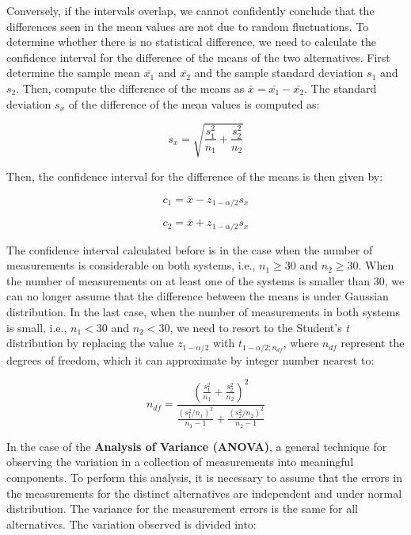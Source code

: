 Conversely, if the intervals overlap, we cannot confidently conclude that the differences seen in the mean values are not due to random fluctuations. To determine whether there is no statistical difference, we need to calculate the confidence interval for the difference of the means of the two alternatives. First determine the sample mean \(\bar{x_1}\) and \(\bar{x_2}\) and the sample standard deviation \(s_1\) and \(s_2\). Then, compute the difference of the means as \(\bar{x} = \bar{x_1} - \bar{x_2}\). The standard deviation \(s_x\) of the difference of the mean values is computed as:

\begin{equation}
  s_x = \sqrt{\frac{s_1^2}{n_1} + \frac{s_2^2}{n_2}}
\end{equation}

Then, the confidence interval for the difference of the means is then given
by:

\begin{equation}
  c_1 = \bar{x} - z_{1 - \alpha/2}s_x
\end{equation}

\begin{equation}
 c_2 = \bar{x} + z_{1 - \alpha/2}s_x
\end{equation}

The confidence interval calculated before is in the case when the number of
measurements is considerable on both systems, i.e., \(n_1 \ge 30\) and \(n_2
   \ge 30\). When the number of measurements on at least one of the systems is
smaller than 30, we can no longer assume that the difference between the means is
under Gaussian distribution. In the last case, when the number of
measurements in both systems is small, i.e., \(n_1 < 30\) and \(n_2 < 30\),
we need to resort to the Student's \emph{t} distribution by replacing the value
\(z_{1 - \alpha/2}\) with \(t_{1 - \alpha/2;n_{df}}\), where \(n_{df}\)
represent the degrees of freedom, which it can approximate by integer number
nearest to:

\begin{equation}
 n_{df} = \frac{(\frac{s_1^2}{n_1} + \frac{s_2^2}{n_2})^2}{\frac{(s_1^2/n_1)^2}{n_1 - 1} + \frac{(s_2^2/n_2)^2}{n_2 - 1}}
\end{equation}

In the case of the \textbf{Analysis of Variance (ANOVA)}, a general technique
for observing the variation in a collection of measurements into meaningful
components. To perform this analysis, it is necessary to assume that the errors
in the measurements for the distinct alternatives are independent and under
normal distribution. The variance for the measurement errors is the same
for all alternatives. The variation observed is divided into:


